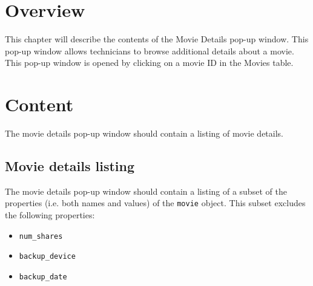 \section{Overview}

This chapter will describe the contents of the Movie Details pop-up window. This pop-up
window allows technicians to browse additional details about a movie.
This pop-up window is opened by clicking on a movie ID in the Movies table.

\section{Content}

The movie details pop-up window should contain a listing of movie details.

\subsection{Movie details listing}

The movie details pop-up window should contain a listing of a subset of the properties 
(i.e. both names and values) of the \texttt{movie} object. This subset excludes the
following properties:
\begin{itemize}\itemsep1pt
    \item \texttt{num\_shares}
    \item \texttt{backup\_device}
    \item \texttt{backup\_date}
\end{itemize}
